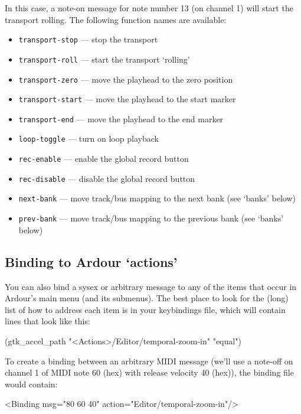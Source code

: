 \documentclass[10pt,a4paper]{book}
\begin{document}
{In this case, a note-on message for note number 13 (on channel 1) will
start the transport rolling. The following function names are
available:

\begin{itemize}
\item \texttt{transport-stop} --- stop the transport 
\item \texttt{transport-roll} --- start the transport `rolling'
\item \texttt{transport-zero} --- move the playhead to the zero position 
\item \texttt{transport-start} --- move the playhead to the start marker 
\item \texttt{transport-end} --- move the playhead to the end marker 
\item \texttt{loop-toggle} --- turn on loop playback 
\item \texttt{rec-enable} --- enable the global record button 
\item \texttt{rec-disable} --- disable the global record button 
\item \texttt{next-bank} --- move track/bus mapping to the next bank (see `banks' below) 
\item \texttt{prev-bank} --- move track/bus mapping to the previous bank (see `banks' below) 
\end{itemize}

\subsection{Binding to Ardour `actions'}

You can also bind a sysex or arbitrary message to any of the items
that occur in Ardour's main menu (and its submenus). The best place to
look for the (long) list of how to address each item is in your
keybindings file, which will contain lines that look like this:

\begin{listing}
(gtk\_accel\_path "<Actions>/Editor/temporal-zoom-in" "equal")
\end{listing}

To create a binding between an arbitrary MIDI message (we'll use a
note-off on channel 1 of MIDI note 60 (hex) with release velocity 40
(hex)), the binding file would contain:

\begin{listing}
<Binding msg="80 60 40" action="Editor/temporal-zoom-in"/>
\end{listing}

}
\end{document}
